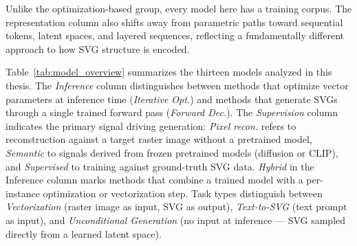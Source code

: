 Unlike the optimization-based group, every model here has a 
training corpus. The representation column also shifts 
away from parametric paths toward sequential tokens, latent 
spaces, and layered sequences, reflecting a fundamentally 
different approach to how SVG structure is encoded.



Table~\ref{tab:model_overview} summarizes the thirteen models 
analyzed in this thesis. The \textit{Inference} column 
distinguishes between methods that optimize vector parameters 
at inference time (\textit{Iterative Opt.}) and methods that 
generate SVGs through a single trained forward pass 
(\textit{Forward Dec.}). The \textit{Supervision} column 
indicates the primary signal driving generation: 
\textit{Pixel recon.} refers to reconstruction against a 
target raster image without a pretrained model, \textit{Semantic} to 
signals derived from frozen pretrained models (diffusion or 
CLIP), and \textit{Supervised} to training against 
ground-truth SVG data. \textit{Hybrid} in the Inference 
column marks methods that combine a trained model with a 
per-instance optimization or vectorization step. Task types distinguish between 
\textit{Vectorization} (raster image as input, SVG as 
output), \textit{Text-to-SVG} (text prompt as input), and 
\textit{Unconditional Generation} (no input at inference --- SVG 
sampled directly from a learned latent space).

